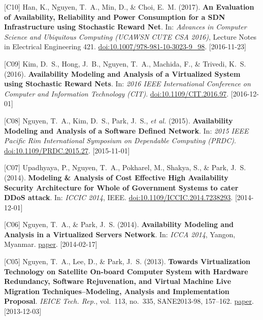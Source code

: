 {\begin{pubenumerate}
\item {\color{green}[C10]} Han, K., Nguyen, T.\ A., Min, D., \& Choi, E.\ M. (2017). \textbf{An Evaluation of Availability, Reliability and Power Consumption for a SDN Infrastructure using Stochastic Reward Net}. In: \textit{Advances in Computer Science and Ubiquitous Computing (UCAWSN CUTE CSA 2016)}, Lecture Notes in Electrical Engineering 421. \href{https://doi.org/10.1007/978-981-10-3023-9_98}{doi:10.1007/978-981-10-3023-9\_98}. [2016-11-23]

\item {\color{green}[C09]} Kim, D.\ S., Hong, J.\ B., Nguyen, T.\ A., Machida, F., \& Trivedi, K.\ S. (2016). \textbf{Availability Modeling and Analysis of a Virtualized System using Stochastic Reward Nets}. In: \textit{2016 IEEE International Conference on Computer and Information Technology (CIT)}. \href{https://doi.org/10.1109/CIT.2016.97}{doi:10.1109/CIT.2016.97}. [2016-12-01]

\item {\color{green}[C08]} Nguyen, T.\ A., Kim, D.\ S., Park, J.\ S., \textit{et al.} (2015). \textbf{Availability Modeling and Analysis of a Software Defined Network}. In: \textit{2015 IEEE Pacific Rim International Symposium on Dependable Computing (PRDC)}. \href{https://doi.org/10.1109/PRDC.2015.27}{doi:10.1109/PRDC.2015.27}. [2015-11-01]

\item {\color{green}[C07]} Upadhyaya, P., Nguyen, T.\ A., Pokharel, M., Shakya, S., \& Park, J.\ S. (2014). \textbf{Modeling \& Analysis of Cost Effective High Availability Security Architecture for Whole of Government Systems to cater DDoS attack}. In: \textit{ICCIC 2014}, IEEE. \href{https://doi.org/10.1109/ICCIC.2014.7238293}{doi:10.1109/ICCIC.2014.7238293}. [2014-12-01]

\item {\color{green}[C06]} Nguyen, T.\ A., \& Park, J.\ S. (2014). \textbf{Availability Modeling and Analysis in a Virtualized Servers Network}. In: \textit{ICCA 2014}, Yangon, Myanmar. \href{https://meral.edu.mm/record/3306/files/12032.pdf}{paper}. [2014-02-17]

\item {\color{green}[C05]} Nguyen, T.\ A., Lee, D., \& Park, J.\ S. (2013). \textbf{Towards Virtualization Technology on Satellite On-board Computer System with Hardware Redundancy, Software Rejuvenation, and Virtual Machine Live Migration Techniques--Modeling, Analysis and Implementation Proposal}. \textit{IEICE Tech. Rep.}, vol.\ 113, no.\ 335, SANE2013-98, 157--162. \href{http://www.ieice.org/ken/paper/20131203lB7P/eng/}{paper}. [2013-12-03]


\end{pubenumerate}}

